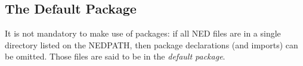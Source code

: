\subsection{The Default Package}
\label{sec:ned-lang:default-package}

It is not mandatory to make use of packages: if all NED files are in a
single directory listed on the NEDPATH, then package declarations (and
imports) can be omitted. Those files are said to be in the \textit{default
package}.






